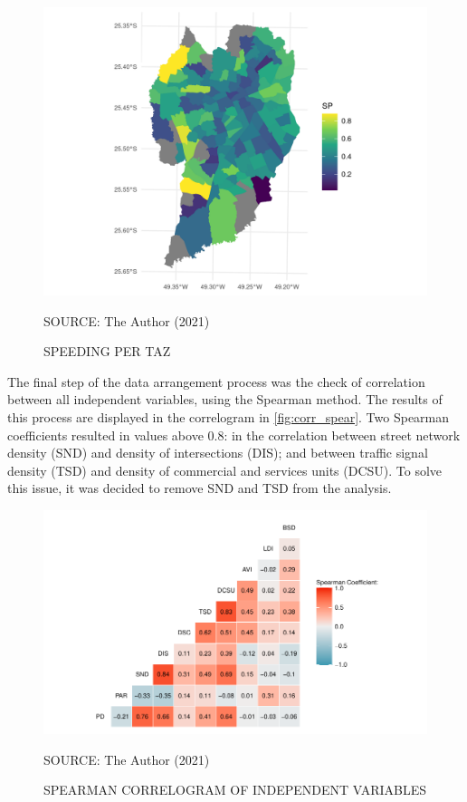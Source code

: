 \begin{figure}[!htbp]
    \centering\footnotesize
    \captionsetup{font=footnotesize}
    \caption{SPEEDING PER TAZ}
    \includegraphics{fig/taz_sp.png}
    \label{fig:taz_sp}
    \par SOURCE: The Author (2021)
\end{figure}


The final step of the data arrangement process was the check of correlation between all independent variables, using the Spearman method. The results of this process are displayed in the correlogram in \autoref{fig:corr_spear}. Two Spearman coefficients resulted in values above 0.8: in the correlation between street network density (SND) and density of intersections (DIS); and between traffic signal density (TSD) and density of commercial and services units (DCSU). To solve this issue, it was decided to remove SND and TSD from the analysis.  

\begin{figure}[!htbp]
    \centering\footnotesize
    \captionsetup{font=footnotesize}
    \caption{SPEARMAN CORRELOGRAM OF INDEPENDENT VARIABLES}
    \includegraphics{fig/corr_spear.pdf}
    \label{fig:corr_spear}
    \par SOURCE: The Author (2021)
\end{figure}

